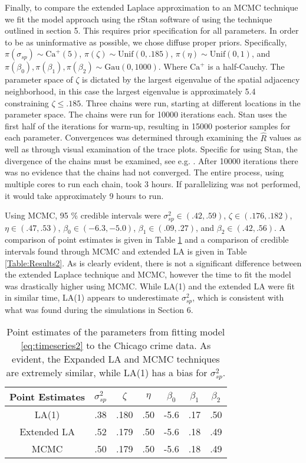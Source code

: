 \documentclass[11pt]{isuthesis}
\begin{document}
	Finally, to compare the extended Laplace approximation to an MCMC technique we fit the model approach using the rStan software of \cite{gelman2015stan} using the technique outlined in section 5.  This requires prior specification for all parameters.  In order to be as uninformative as possible, we chose diffuse proper priors.  Specifically, $\pi(\sigma_{sp})\sim \text{Ca}^{+}(5)$, $\pi(\zeta) \sim \text{Unif}(0,.185)$, $\pi(\eta)\sim \text{Unif}(0,1)$, and $\pi(\beta_0),\pi(\beta_1),\pi(\beta_2) \sim \text{Gau} (0,1000)$.  Where $\text{Ca}^+$ is a half-Cauchy.  The parameter space of $\zeta$ is dictated by the largest eigenvalue of the spatial adjacency neighborhood, in this case the largest eigenvalue is approximately 5.4 constraining $\zeta \leq .185$.  Three chains were run, starting at different locations in the parameter space.  The chains were run for 10000 iterations each.  Stan uses the first half of the iterations for warm-up, resulting in 15000 posterior samples for each parameter.  Convergences was determined through examining the $\hat{R}$ values as well as through visual examination of the trace plots.  Specific for using Stan, the divergence of the chains must be examined, see e.g. \cite{betancort}.  After 10000 iterations there was no evidence that the chains had not converged.  The entire process, using multiple cores to run each chain, took 3 hours.  If parallelizing was not performed, it would take approximately 9 hours to run.
	
	Using MCMC, 95 \% credible intervals were $\sigma_{sp}^2 \in (.42,.59)$, $\zeta \in (.176,.182)$, $\eta \in (.47,.53)$, $\beta_0 \in (-6.3,-5.0)$, $\beta_1 \in (.09,.27)$, and $\beta_2 \in (.42,.56)$.  A comparison of point estimates is given in Table \ref{Table:Results} and a comparison of credible intervals found through MCMC and extended LA is given in Table \ref{Table:Results2}.  As is clearly evident, there is not a significant difference between the extended Laplace technique and MCMC, however the time to fit the model was drastically higher using MCMC.  While LA(1) and the extended LA were fit in similar time, LA(1) appears to underestimate $\sigma_{sp}^2$, which is consistent with what was found during the simulations in Section 6.
	
	\begin{table}[h]
		\begin{center}
			\begin{tabular}{ |c|c|c|c|c|c|c| } 
				\hline
				Point Estimates & $\sigma_{sp}^2$ & $\zeta$ & $\eta$ & $\beta_0$ & $\beta_1$ & $\beta_2$\\
				\hline
				LA(1) & .38 & .180 &.50& -5.6 & .17 & .50 \\ 
				Extended LA & .52 & .179 &.50& -5.6 & .18 & .49\\
				MCMC & .50 & .179 & .50 & -5.6 & .18 & .49\\
				\hline
			\end{tabular}
		\end{center}
		\caption{Point estimates of the parameters from fitting model \eqref{eq:timeseries2} to the Chicago crime data.  As evident, the Expanded LA and MCMC techniques are extremely similar, while LA(1) has a bias for $\sigma_{sp}^2$.}\label{Table:Results}
	\end{table}
	
\end{document}
